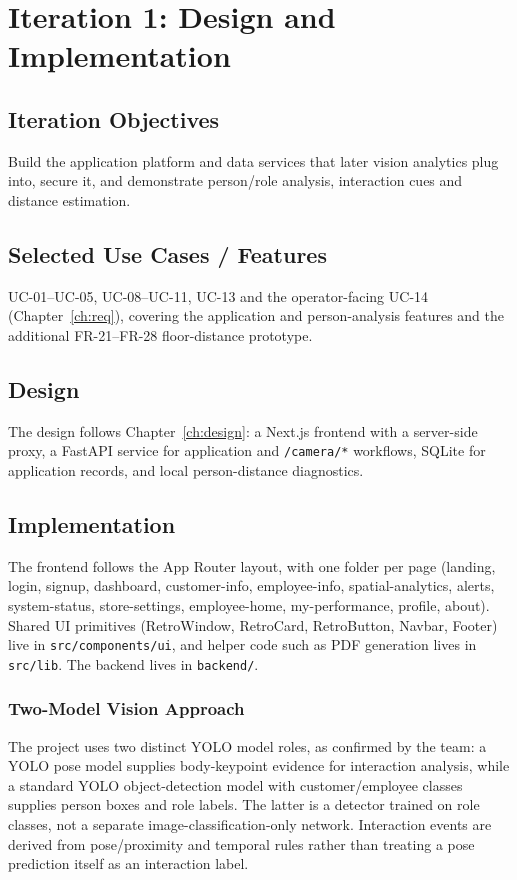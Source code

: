 \chapter{Iteration 1: Design and Implementation}
\label{ch:iter1}
\section{Iteration Objectives}
Build the application platform and data services that later vision analytics plug into, secure it, and demonstrate person/role analysis, interaction cues and distance estimation.

\section{Selected Use Cases / Features}
UC-01--UC-05, UC-08--UC-11, UC-13 and the operator-facing UC-14 (Chapter~\ref{ch:req}), covering the application and person-analysis features and the additional FR-21--FR-28 floor-distance prototype.

\section{Design}
The design follows Chapter~\ref{ch:design}: a Next.js frontend with a server-side proxy, a FastAPI service for application and \texttt{/camera/*} workflows, SQLite for application records, and local person-distance diagnostics.

\section{Implementation}
The frontend follows the App Router layout, with one folder per page (landing, login, signup, dashboard, customer-info, employee-info, spatial-analytics, alerts, system-status, store-settings, employee-home, my-performance, profile, about). Shared UI primitives (RetroWindow, RetroCard, RetroButton, Navbar, Footer) live in \texttt{src/components/ui}, and helper code such as PDF generation lives in \texttt{src/lib}. The backend lives in \texttt{backend/}.

\subsection{Two-Model Vision Approach}
The project uses two distinct YOLO model roles, as confirmed by the team: a YOLO pose model supplies body-keypoint evidence for interaction analysis, while a standard YOLO object-detection model with customer/employee classes supplies person boxes and role labels. The latter is a detector trained on role classes, not a separate image-classification-only network. Interaction events are derived from pose/proximity and temporal rules rather than treating a pose prediction itself as an interaction label.

